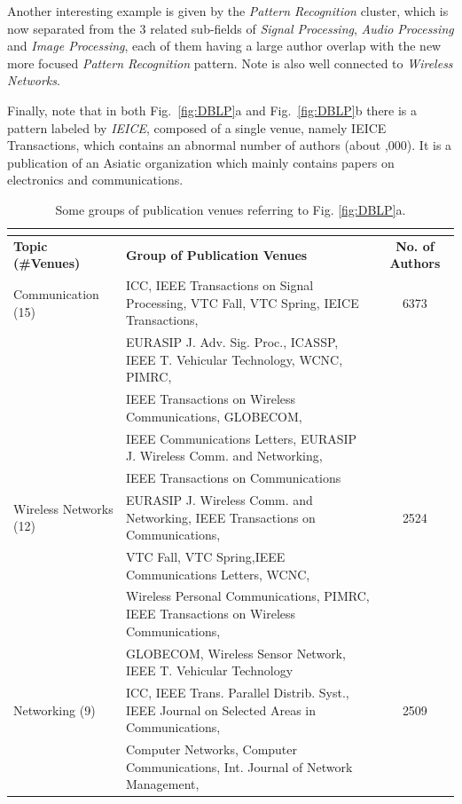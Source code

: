 \documentclass{article}
\begin{document}
Another interesting example is given by the {\em Pattern Recognition} cluster, which is now separated from the 3 related sub-fields of {\em Signal Processing}, {\em Audio Processing} and {\em Image Processing}, each of them having a large author overlap with the new more focused {\em Pattern Recognition} pattern. Note is also well connected to {\em Wireless Networks}.

Finally, note that in both Fig.~\ref{fig:DBLP}a and Fig.~\ref{fig:DBLP}b there is a pattern labeled by \emph{IEICE}, composed of a single venue, namely IEICE Transactions, which contains an abnormal number of authors (about ,000). It is a publication of an Asiatic organization which mainly contains papers on electronics and communications.
 



\begin{table}
\small
\begin{tabular}{l l c}
\multicolumn{3}{c}{\caption{\label{tab:venue-clusters}Some groups of publication venues referring to Fig. \ref{fig:DBLP}a.}} \\
\hline
{\bf Topic (\#Venues)} & {\bf Group of Publication Venues} & {\bf No. of Authors}\\
\hline
Communication (15)  
&
ICC, IEEE Transactions on Signal Processing,  VTC Fall,  VTC Spring, IEICE Transactions, & 6373 \\
&   EURASIP J. Adv. Sig. Proc.,  ICASSP,  IEEE T. Vehicular Technology,  WCNC,  PIMRC, & \\
&  IEEE Transactions on Wireless Communications,  GLOBECOM,  & \\
&   IEEE Communications Letters, EURASIP J. Wireless Comm. and Networking,  & \\
& IEEE Transactions on Communications & \\
%
\hline
Wireless Networks (12)
&
EURASIP J. Wireless Comm. and Networking,  IEEE Transactions on Communications,  &
2524
\\
&    VTC Fall,  VTC Spring,IEEE Communications Letters, WCNC,      & \\
&   Wireless Personal Communications, PIMRC,  IEEE Transactions on Wireless Communications,  & \\
&   GLOBECOM,  Wireless Sensor Network, IEEE T. Vehicular Technology & \\
\hline
Networking (9)
&
ICC,  IEEE Trans. Parallel Distrib. Syst.,   IEEE Journal on Selected Areas in Communications,
&
2509
\\
&   Computer Networks, Computer Communications, Int. Journal of Network Management,  & \\

\end{tabular}
\end{table}
\end{document}
